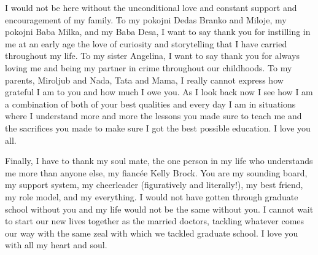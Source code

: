 \begin{doublespace}
I would not be here without the unconditional love and constant support and encouragement of my family. To my pokojni Dedas Branko and Miloje, my pokojni Baba Milka, and my Baba Desa, I want to say thank you for instilling in me at an early age the love of curiosity and storytelling that I have carried throughout my life. To my sister Angelina, I want to say thank you for always loving me and being my partner in crime throughout our childhoods. To my parents, Miroljub and Nada, Tata and Mama, I really cannot express how grateful I am to you and how much I owe you. As I look back now I see how I am a combination of both of your best qualities and every day I am in situations where I understand more and more the lessons you made sure to teach me and the sacrifices you made to make sure I got the best possible education. I love you all. 

Finally, I have to thank my soul mate, the one person in my life who understands me more than anyone else, my fianc\'{e}e Kelly Brock. You are my sounding board, my support system, my cheerleader (figuratively and literally!), my best friend, my role model, and my everything. I would not have gotten through graduate school without you and my life would not be the same without you. I cannot wait to start our new lives together as the married doctors, tackling whatever comes our way with the same zeal with which we tackled graduate school. I love you with all my heart and soul. 

\end{doublespace}

